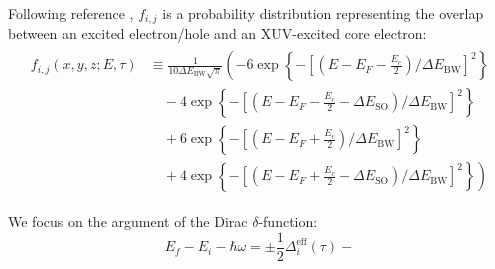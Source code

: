 Following reference \cite{zurchDirectSimultaneousObservation2017}, $f_{i,j}$ is a probability distribution representing the overlap between an excited electron/hole and an XUV-excited core electron:
\begin{align}
\begin{split}
f_{i,j}(x, y, z; E, \tau) &\equiv \frac{1}{10 \Delta E_{\textrm{BW}} \sqrt{\pi}} \left( -6 \exp \left\{- \left[ \left(E-E_F-\frac{E_c}{2} \right)/\Delta E_{\textrm{BW}} \right]^2 \right\} \right. \\
&\quad - 4 \exp \left\{- \left[ \left(E-E_F-\frac{E_c}{2}-\Delta E_{\textrm{SO}} \right)/\Delta E_{\textrm{BW}} \right]^2 \right\} \\
&\quad + 6 \exp \left\{- \left[ \left(E-E_F+\frac{E_c}{2} \right)/\Delta E_{\textrm{BW}} \right]^2 \right\} \\
&\left. \quad + 4 \exp \left\{- \left[ \left(E-E_F+\frac{E_c}{2}-\Delta E_{\textrm{SO}} \right)/\Delta E_{\textrm{BW}} \right]^2 \right\} \right)
\end{split}
\label{eqn:f_ij}
\end{align}


We focus on the argument of the Dirac $\delta$-function:
\begin{equation}
E_f - E_i - \hbar \omega = \pm \frac{1}{2} \Delta_i^{\textrm{eff}} (\tau) - 
\end{equation}


